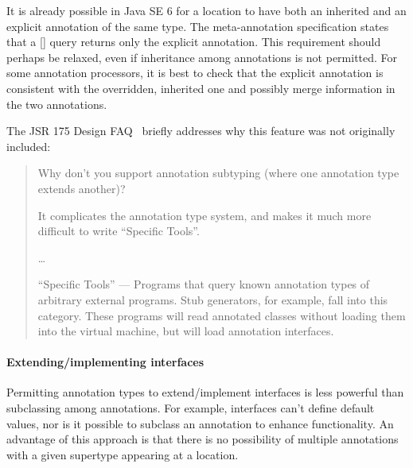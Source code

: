 \documentclass[10pt]{article}
\begin{document}
It is already possible in Java SE 6 for a location to have both an
inherited and an explicit annotation of the same type.  The 
 meta-annotation specification states that a
[] query returns only the
explicit annotation.  This requirement should perhaps be relaxed, even if
inheritance among annotations is not permitted.  For some annotation
processors, it is best to check that the explicit annotation is consistent
with the overridden, inherited one and possibly merge information in the
two annotations.


The JSR 175 Design FAQ~\cite{JSR175-PFD2} briefly addresses why this
feature was not originally included:

\begin{quote}
Why don't you support annotation subtyping (where one annotation type
extends another)?

It complicates the annotation type system, and makes it much more difficult
to write ``Specific Tools''.

\ldots

``Specific Tools'' --- Programs that query known annotation types of
arbitrary external programs. Stub generators, for example, fall into this
category. These programs will read annotated classes without loading them
into the virtual machine, but will load annotation interfaces.
\end{quote}




\paragraph{Extending/implementing interfaces}

Permitting annotation types to extend/implement interfaces is less
powerful than subclassing among annotations.
For example, interfaces can't define default values, nor is it possible
to subclass an annotation to enhance functionality.
An advantage of this approach is that there is no possibility of multiple
annotations with a given supertype appearing at a location.
\end{document}
